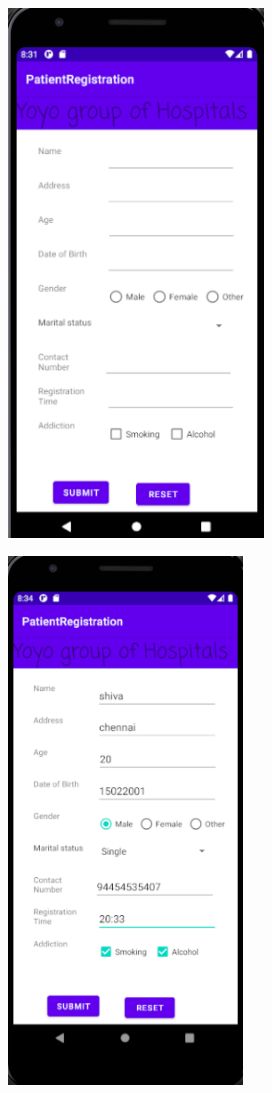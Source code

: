 \documentclass[12pt,letterpaper]{article}
\begin{document}
\subsection*{}
\begin{figure}[h]
    \centering
    \includegraphics[height=14cm, keepaspectratio]{Outputs/OP1.png}
\end{figure}
\begin{figure}
    \centering
    \includegraphics[height=14cm, keepaspectratio]{Outputs/OP3.png}
\end{figure}
\end{document}
